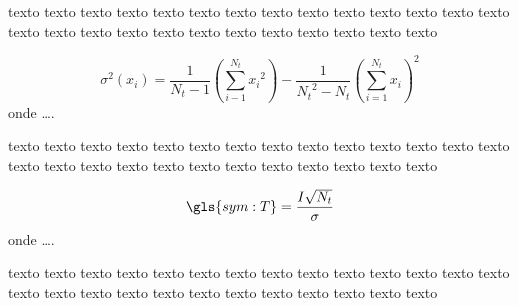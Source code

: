 texto texto texto texto texto texto texto texto texto texto texto texto texto
texto texto texto texto texto texto texto texto texto texto texto texto texto





\begin{equation}
	\ensuremath{
		\sigma^2(x_i) = 	\frac{1}{N_t - 1}
					{\left(
					\sum_{i-1}^{N_t}
						{x_i}^2 
					\right)}
					- 
					\frac{1}{{N_t}^2 - N_t}
					{\left(
						\sum_{i=1}^{N_t}{x_i}
					\right)}^2
	}
	\label{eq:var}
\end{equation}
onde \ldots.


texto texto texto texto texto texto texto texto texto texto texto texto texto
texto texto texto texto texto texto texto texto texto texto texto texto texto




\begin{equation}
	\ensuremath{
		\gls{sym:T} = \frac{I\sqrt{N_t}}{\sigma}
	}
	\label{eq:T}
\end{equation}
onde \ldots.


texto texto texto texto texto texto texto texto texto texto texto texto texto
texto texto texto texto texto texto texto texto texto texto texto texto texto


